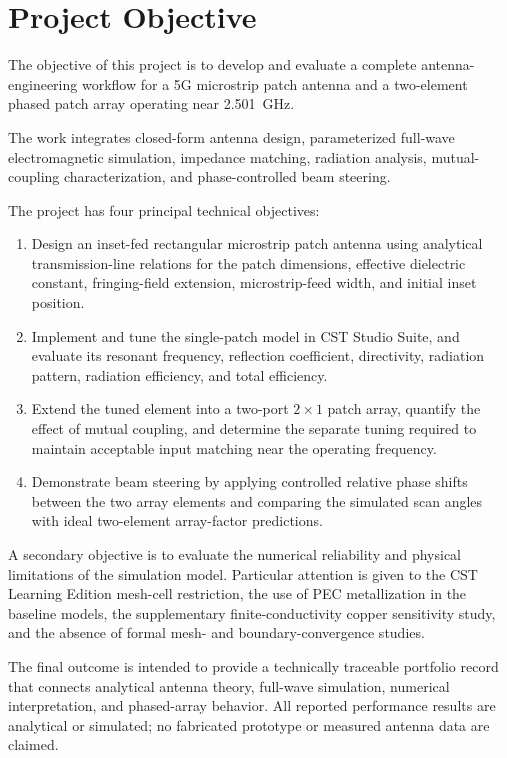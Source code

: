 
\chapter*{Project Objective}
\thispagestyle{fancy}
\begingroup
\setlength{\emergencystretch}{2em}

The objective of this project is to develop and evaluate a complete
antenna-engineering workflow for a 5G microstrip patch antenna and a
two-element phased patch array operating near 2.501~GHz.

The work integrates closed-form antenna design, parameterized
full-wave electromagnetic simulation, impedance matching, radiation
analysis, mutual-coupling characterization, and phase-controlled beam
steering.

The project has four principal technical objectives:

\begin{enumerate}
    \item Design an inset-fed rectangular microstrip patch antenna using
    analytical transmission-line relations for the patch dimensions,
    effective dielectric constant, fringing-field extension,
    microstrip-feed width, and initial inset position.

    \item Implement and tune the single-patch model in CST Studio Suite,
    and evaluate its resonant frequency, reflection coefficient,
    directivity, radiation pattern, radiation efficiency, and total
    efficiency.

    \item Extend the tuned element into a two-port $2\times1$ patch array,
    quantify the effect of mutual coupling, and determine the separate
    tuning required to maintain acceptable input matching near the
    operating frequency.

    \item Demonstrate beam steering by applying controlled relative phase
    shifts between the two array elements and comparing the simulated
    scan angles with ideal two-element array-factor predictions.
\end{enumerate}

A secondary objective is to evaluate the numerical reliability and
physical limitations of the simulation model. Particular attention is
given to the CST Learning Edition mesh-cell restriction, the use of PEC
metallization in the baseline models, the supplementary
finite-conductivity copper sensitivity study, and the absence of formal
mesh- and boundary-convergence studies.

The final outcome is intended to provide a technically traceable
portfolio record that connects analytical antenna theory, full-wave
simulation, numerical interpretation, and phased-array behavior.
All reported performance results are analytical or simulated; no
fabricated prototype or measured antenna data are claimed.
\endgroup
